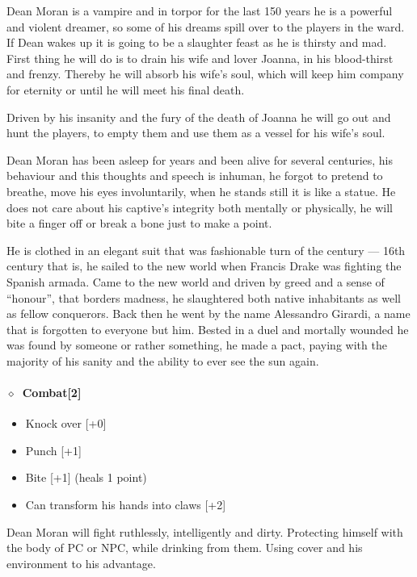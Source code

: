\documentclass[bg-full]{resources/stylesheets/kult}
\begin{document}
Dean Moran is a vampire and in torpor for the last 150 years he is a powerful and violent dreamer, so some of his dreams spill
over to the players in the ward.  If Dean wakes up it is going to be a slaughter feast as he is thirsty and mad.  First thing he
will do is to drain his wife and lover Joanna, in his blood-thirst and frenzy.  Thereby he will absorb his wife's soul, which
will keep him company for eternity or until he will meet his final death.

Driven by his insanity and the fury of the death of Joanna he will go out and hunt the players, to empty them and use them as a
vessel for his wife's soul.

Dean Moran has been asleep for years and been alive for several centuries, his behaviour and this thoughts and speech is
inhuman, he forgot to pretend to breathe, move his eyes involuntarily, when he stands still it is like a statue.  He does not
care about his captive's integrity both mentally or physically, he will bite a finger off or break a bone just to make a point.

He is clothed in an elegant suit that was fashionable turn of the century --- 16th century that is, he sailed to the new world
when Francis Drake was fighting the Spanish armada.  Came to the new world and  driven by greed and a sense of “honour”, that
borders madness, he slaughtered both native inhabitants as well as fellow conquerors.  Back then he went by the name Alessandro
Girardi, a name that is forgotten to everyone but him.  Bested in a duel and mortally wounded he was found by someone or rather
something, he made a pact, paying with the majority of his sanity and the ability to ever see the sun again.

\paragraph{\(\diamond\)~Combat[2]}%
\begin{itemize}[noitemsep]
  \item Knock over [+0]
  \item Punch [+1]
  \item Bite [+1] (heals 1 point)
  \item Can transform his hands into claws [+2]
\end{itemize}
Dean Moran will fight ruthlessly, intelligently and dirty.
Protecting himself with the body of PC or NPC, while drinking from them.
Using cover and his environment to his advantage.
\KULTrule%
\end{document}
